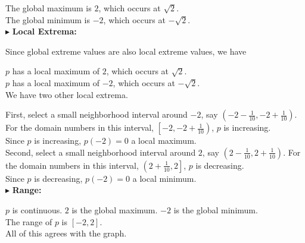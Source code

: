 \documentclass{ximera}
\begin{document}
\begin{example}
The global maximum is $2$, which occurs at $\sqrt{2}$. \\


The global minimum is $-2$, which occurs at $-\sqrt{2}$. \\









$\blacktriangleright$ \textbf{\textcolor{blue!55!black}{Local Extrema:}}  


Since global extreme values are also local extreme values, we have 


$p$ has a local maximum of $2$, which occurs at $\sqrt{2}$. \\


$p$ has a local maximum of $-2$, which occurs at $-\sqrt{2}$. \\


We have two other local extrema.






First, select a small neighborhood interval around $-2$, say $\left( -2 - \frac{1}{10}, -2 + \frac{1}{10} \right)$. For the domain numbers in this interval, $\left[ -2, -2 + \frac{1}{10} \right)$, $p$ is increasing. \\

Since $p$ is increasing, $p(-2)= 0$ a local maximum. \\







Second, select a small neighborhood interval around $2$, say $\left( 2 - \frac{1}{10}, 2 + \frac{1}{10} \right)$. For the domain numbers in this interval, $\left( 2 + \frac{1}{10}, 2 \right]$, $p$ is decreasing. \\

Since $p$ is decreasing, $p(-2)= 0$ a local minimum. \\










$\blacktriangleright$ \textbf{\textcolor{blue!55!black}{Range:}}


$p$ is continuous. $2$ is the global maximum.  $-2$ is the global minimum.  \\


The range of $p$ is $[-2, 2]$. \\






All of this agrees with the graph.

\end{example}
\end{document}
